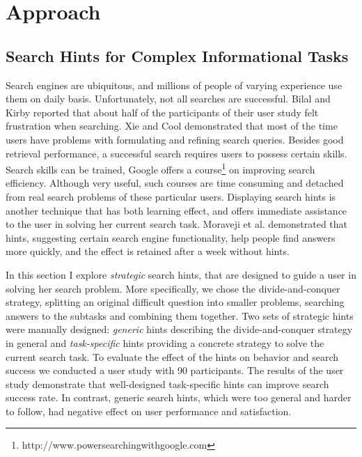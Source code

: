 \section{Approach}
\label{section:users:approach}


\subsection{Search Hints for Complex Informational Tasks}
\label{section:users:hints}

Search engines are ubiquitous, and millions of people of varying experience use them on daily basis.
Unfortunately, not all searches are successful.
Bilal and Kirby \cite{Bilal:2002:DSI:637512.637516} reported that about half of the participants of their user study felt frustration when searching.
Xie and Cool \cite{xie2009understanding} demonstrated that most of the time users have problems with formulating and refining search queries.
Besides good retrieval performance, a successful search requires users to possess certain skills.
Search skills can be trained, \eg Google offers a course\footnote{http://www.powersearchingwithgoogle.com} on improving search efficiency.
Although very useful, such courses are time consuming and detached from real search problems of these particular users.
Displaying search hints is another technique that has both learning effect, and offers immediate assistance to the user in solving her current search task.
Moraveji et al. \cite{Moraveji:2011:MIU:2009916.2009966} demonstrated that hints, suggesting certain search engine functionality, help people find answers more quickly, and the effect is retained after a week without hints.

In this section I explore {\em strategic} search hints, that are designed to guide a user in solving her search problem.
More specifically, we chose the divide-and-conquer strategy, \ie splitting an original difficult question into smaller problems, searching answers to the subtasks and combining them together.
Two sets of strategic hints were manually designed: {\em generic} hints describing the divide-and-conquer strategy in general and {\em task-specific} hints providing a concrete strategy to solve the current search task.
To evaluate the effect of the hints on behavior and search success we conducted a user study with 90 participants.
The results of the user study demonstrate that well-designed task-specific hints can improve search success rate.
In contrast, generic search hints, which were too general and harder to follow, had negative effect on user performance and satisfaction.

